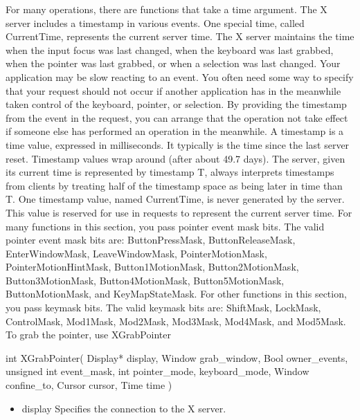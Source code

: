 \documentclass{report}
\begin{document}
\begin{itemize}
            \bigbreak \noindent 
            For many operations, there are functions that take a time argument. The X server includes a timestamp in various events. One special time, called CurrentTime, represents the current server time. The X server maintains the time when the input focus was last changed, when the keyboard was last grabbed, when the pointer was last grabbed, or when a selection was last changed. Your application may be slow reacting to an event. You often need some way to specify that your request should not occur if another application has in the meanwhile taken control of the keyboard, pointer, or selection. By providing the timestamp from the event in the request, you can arrange that the operation not take effect if someone else has performed an operation in the meanwhile.
            \bigbreak \noindent 
            A timestamp is a time value, expressed in milliseconds. It typically is the time since the last server reset. Timestamp values wrap around (after about 49.7 days). The server, given its current time is represented by timestamp T, always interprets timestamps from clients by treating half of the timestamp space as being later in time than T. One timestamp value, named CurrentTime, is never generated by the server. This value is reserved for use in requests to represent the current server time.
            \bigbreak \noindent 
            For many functions in this section, you pass pointer event mask bits. The valid pointer event mask bits are: ButtonPressMask, ButtonReleaseMask, EnterWindowMask, LeaveWindowMask, PointerMotionMask, PointerMotionHintMask, Button1MotionMask, Button2MotionMask, Button3MotionMask, Button4MotionMask, Button5MotionMask, ButtonMotionMask, and KeyMapStateMask. For other functions in this section, you pass keymask bits. The valid keymask bits are: ShiftMask, LockMask, ControlMask, Mod1Mask, Mod2Mask, Mod3Mask, Mod4Mask, and Mod5Mask.
            \bigbreak \noindent 
            To grab the pointer, use XGrabPointer
            \bigbreak \noindent 
            \begin{cppcode}
            int XGrabPointer(
                Display* display,
                Window grab_window,
                Bool owner_events,
                unsigned int event_mask,
                int pointer_mode, keyboard_mode,
                Window confine_to,
                Cursor cursor,
                Time time
            )
            \end{cppcode}
            \begin{itemize}
                \item display Specifies the connection to the X server.

\end{itemize}
\end{itemize}
\end{document}
